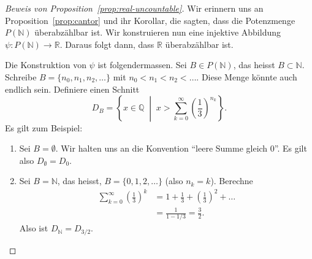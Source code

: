 \documentclass[../main.tex]{subfiles}
\begin{document}
\begin{proof}[Beweis von Proposition~\ref{prop:real-uncountable}]
  Wir erinnern uns an Proposition~\ref{prop:cantor} und ihr Korollar,
  die sagten, dass die Potenzmenge $P(\mathbb N )$ überabzählbar ist.
  Wir konstruieren nun eine injektive Abbildung
  $\psi \colon P(\mathbb N) \to \mathbb R$.
  Daraus folgt dann, dass $\mathbb R$ überabzählbar ist.

  Die Konstruktion von $\psi$ ist folgendermassen.
  Sei $B \in P(\mathbb N)$, das heisst $B \subset \mathbb N$.
  Schreibe $B = \{n_{0}, n_{1}, n_{2}, \dots\}$ mit $n_{0} < n_{1} < n_{2} < \dots$.
  Diese Menge könnte auch endlich sein.
  Definiere einen Schnitt
  \[
    D_{B} = \left\{x \in \mathbb Q \; \middle| \; x > \sum_{k=0}^{\infty}
      {\left( \frac{1}{3}\right)}^{n_{k}}
    \right\}.
  \]
  Es gilt zum Beispiel:
  \begin{enumerate}[(1)]
    \item Sei $B = \emptyset$.
      Wir halten uns an die Konvention ``leere Summe gleich $0$''. Es gilt also
      $D_{\emptyset} = D_{0}$.
    \item Sei $B = \mathbb N$, das heisst, $B = \{0, 1, 2, \dots\}$
      (also $n_{k} = k$). Berechne
      \begin{align*}
        \sum_{k=0}^{\infty}
        {\left(\frac{1}{3}\right)}^{k}
        &= 1 + \frac{1}{3} + {\left(\frac{1}{3}\right)}^{2} + \dots \\
        &= \frac{1}{1 - 1/3}
          = \frac{3}{2}.
      \end{align*}
      Also ist $D_{\mathbb N} = D_{3/2}$.
  \end{enumerate}


\end{proof}
\end{document}
